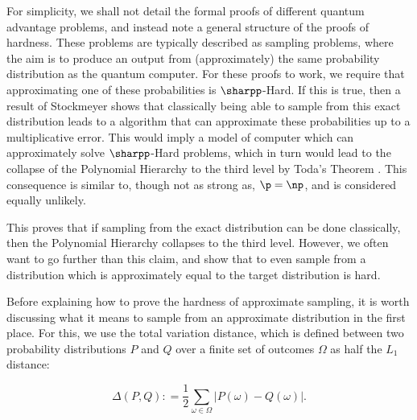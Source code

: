 For simplicity, we shall not detail the formal proofs of different quantum advantage problems, and instead note a general structure of the proofs of hardness. These problems are typically described as sampling problems, where the aim is to produce an output from (approximately) the same probability distribution as the quantum computer. For these proofs to work, we require that approximating one of these probabilities is $\sharpp$-Hard. If this is true, then a result of Stockmeyer \cite{stockmeyer1983} shows that classically being able to sample from this exact distribution leads to a algorithm that can approximate these probabilities up to a multiplicative error. This would imply a model of computer which can approximately solve $\sharpp$-Hard problems, which in turn would lead to the collapse of the Polynomial Hierarchy to the third level by Toda's Theorem \cite{toda1991}. This consequence is similar to, though not as strong as, $\p=\np$, and is considered equally unlikely.

This proves that if sampling from the exact distribution can be done classically, then the Polynomial Hierarchy collapses to the third level. However, we often want to go further than this claim, and show that to even sample from a distribution which is approximately equal to the target distribution is hard.

Before explaining how to prove the hardness of approximate sampling, it is worth discussing what it means to sample from an approximate distribution in the first place. For this, we use the total variation distance, which is defined between two probability distributions $P$ and $Q$ over a finite set of outcomes $\Omega$ as half the $L_1$ distance:

\begin{equation}
\Delta(P, Q) \colon= \frac{1}{2}\sum_{\omega \in \Omega}|P(\omega) - Q(\omega)|.
\end{equation}


